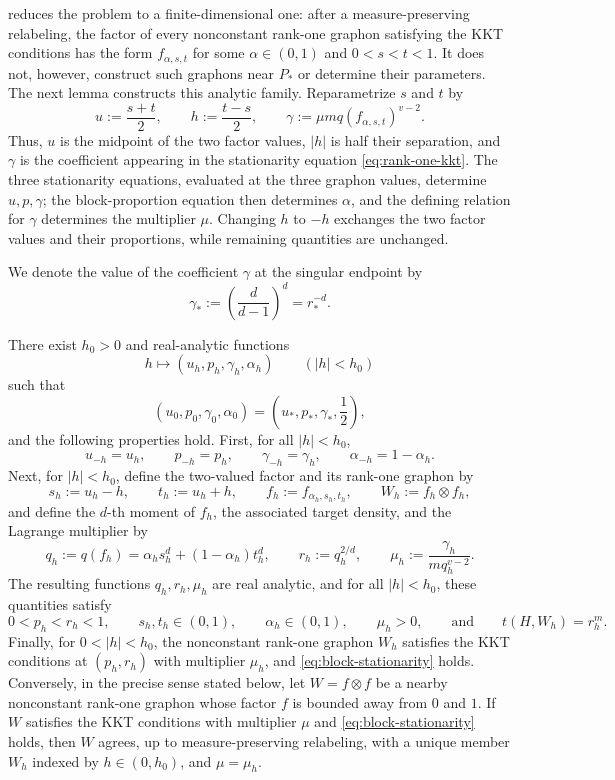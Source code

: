 reduces the problem to a finite-dimensional
one: after a measure-preserving relabeling, the factor of every nonconstant
rank-one graphon satisfying the KKT conditions has the form
$f_{\alpha,s,t}$ for some $\alpha\in(0,1)$ and $0<s<t<1$.  It does not,
however, construct such graphons near $P_*$ or determine their parameters.
The next lemma constructs this analytic family.
Reparametrize $s$ and $t$ by
\[
  u:=\frac{s+t}{2},
  \qquad
  h:=\frac{t-s}{2},
  \qquad
  \gamma:=\mu m q(f_{\alpha,s,t})^{v-2}.
\]
Thus, $u$ is the midpoint of the two factor values, $|h|$ is half their
separation, and $\gamma$ is the coefficient appearing in the
stationarity equation \eqref{eq:rank-one-kkt}.
The three stationarity equations, evaluated at the three graphon values,
determine $u,p,\gamma$; the block-proportion equation then determines
$\alpha$, and the defining relation for $\gamma$ determines the multiplier $\mu$.
Changing $h$ to $-h$ exchanges the two factor values and their proportions,
while remaining quantities are unchanged.

We denote the value of the coefficient $\gamma$ at the singular endpoint by
\[
  \gamma_*:=\left(\frac{d}{d-1}\right)^d=r_*^{-d}.
\]

\begin{lemma}
\label{lem:rank-one-kkt-family}
There exist $h_0>0$ and real-analytic functions
\[
  h\longmapsto(u_h,p_h,\gamma_h,\alpha_h)
  \qquad (|h|<h_0)
\]
such that
\[
  (u_0,p_0,\gamma_0,\alpha_0)
  =\left(u_*,p_*,\gamma_*,\frac12\right),
\]
and the following properties hold.  First, for all $|h|<h_0$,
\[
  u_{-h}=u_h,\qquad p_{-h}=p_h,\qquad
  \gamma_{-h}=\gamma_h,\qquad \alpha_{-h}=1-\alpha_h.
\]
Next, for $|h|<h_0$, define the two-valued factor and its rank-one graphon by
\[
  s_h:=u_h-h,
  \qquad 
  t_h:=u_h+h,
  \qquad
  f_h:=f_{\alpha_h,s_h,t_h}, 
  \qquad
  W_h:=f_h\otimes f_h,
\]
and define the $d$-th moment of $f_h$, the associated target density, and the
Lagrange multiplier by
\[
  q_h:=q(f_h)=\alpha_hs_h^d+(1-\alpha_h)t_h^d,
  \qquad
  r_h:=q_h^{2/d}, 
  \qquad
  \mu_h:=\frac{\gamma_h}{m q_h^{v-2}}.
\]
The resulting functions $q_h,r_h,\mu_h$ are real analytic, and for all
$|h|<h_0$, these quantities satisfy
\[
  0<p_h<r_h<1,
  \qquad s_h,t_h\in(0,1),
  \qquad \alpha_h\in(0,1),
  \qquad \mu_h>0,
  \qquad\text{and}\qquad
  t(H,W_h)=r_h^m.
\]
Finally, for $0<|h|<h_0$, the nonconstant rank-one graphon $W_h$ satisfies
the KKT conditions at $(p_h,r_h)$ with multiplier $\mu_h$, and
\eqref{eq:block-stationarity} holds.  Conversely, in the precise
sense stated below, let $W=f\otimes f$ be a nearby nonconstant rank-one
graphon whose factor $f$ is bounded away from $0$ and $1$.  If $W$ satisfies
the KKT conditions with multiplier $\mu$ and
\eqref{eq:block-stationarity} holds, then $W$ agrees, up to
measure-preserving relabeling, with a unique member $W_h$ indexed by
$h\in(0,h_0)$, and $\mu=\mu_h$.
\end{lemma}

